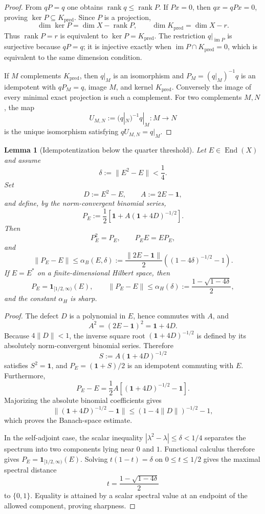 \documentclass[11pt]{article}
\newtheorem{lemma}[theorem]{Lemma}
\theoremstyle{definition}
\theoremstyle{remark}
\newcommand{\one}{\mathbf 1}
\newcommand{\rank}{\operatorname{rank}}
\newcommand{\End}{\operatorname{End}}
\newcommand{\norm}[1]{\lVert#1\rVert}
\newcommand{\pred}{\mathrm{pred}}
\begin{document}
\begin{proof}
From \(qP=q\) one obtains \(\rank q\le\rank P\).  If \(Px=0\), then
\(qx=qPx=0\), proving \(\ker P\subseteq K_{\pred}\).  Since \(P\) is a
projection,
\[
 \dim\ker P=\dim X-\rank P,\qquad
 \dim K_{\pred}=\dim X-r.
\]
Thus \(\rank P=r\) is equivalent to \(\ker P=K_{\pred}\).  The restriction
\(q|_{\operatorname{im}P}\) is surjective because \(qP=q\); it is injective
exactly when \(\operatorname{im}P\cap K_{\pred}=0\), which is equivalent to
the same dimension condition.

If \(M\) complements \(K_{\pred}\), then \(q|_M\) is an isomorphism and
\(P_M=(q|_M)^{-1}q\) is an idempotent with \(qP_M=q\), image \(M\), and
kernel \(K_{\pred}\).  Conversely the image of every minimal exact
projection is such a complement.  For two complements \(M,N\), the map
\[
 U_{M,N}:=(q|_N)^{-1}q|_M:M\longrightarrow N
\]
is the unique isomorphism satisfying \(qU_{M,N}=q|_M\).
\end{proof}

\begin{lemma}[Idempotentization below the quarter threshold]
\label{lem:predictive-idempotentization}
Let \(E\in\End(X)\) and assume
\[
 \delta:=\norm{E^2-E}<\frac14.
\]
Set
\[
 D:=E^2-E,\qquad A:=2E-\one,
\]
and define, by the norm-convergent binomial series,
\[
 P_E:=\frac12\left[\one+A(\one+4D)^{-1/2}\right].
\]
Then
\[
 P_E^2=P_E,\qquad P_EE=EP_E,
\]
and
\[
 \norm{P_E-E}
 \le
 \alpha_B(E,\delta)
 :=
 \frac{\norm{2E-\one}}2
 \left((1-4\delta)^{-1/2}-1\right).
\]
If \(E=E^*\) on a finite-dimensional Hilbert space, then
\[
 P_E=\mathbf 1_{[1/2,\infty)}(E),\qquad
 \norm{P_E-E}
 \le
 \alpha_H(\delta):=
 \frac{1-\sqrt{1-4\delta}}2,
\]
and the constant \(\alpha_H\) is sharp.
\end{lemma}

\begin{proof}
The defect \(D\) is a polynomial in \(E\), hence commutes with \(A\), and
\[
 A^2=(2E-\one)^2=\one+4D.
\]
Because \(4\norm D<1\), the inverse square root
\((\one+4D)^{-1/2}\) is defined by its absolutely norm-convergent binomial
series.  Therefore
\[
 S:=A(\one+4D)^{-1/2}
\]
satisfies \(S^2=\one\), and \(P_E=(\one+S)/2\) is an idempotent commuting
with \(E\).  Furthermore,
\[
 P_E-E
 =\frac12A\left[(\one+4D)^{-1/2}-\one\right].
\]
Majorizing the absolute binomial coefficients gives
\[
 \norm{(\one+4D)^{-1/2}-\one}
 \le (1-4\norm D)^{-1/2}-1,
\]
which proves the Banach-space estimate.

In the self-adjoint case, the scalar inequality
\(|\lambda^2-\lambda|\le\delta<1/4\) separates the spectrum into two
components lying near \(0\) and \(1\).  Functional calculus therefore gives
\(P_E=\mathbf 1_{[1/2,\infty)}(E)\).  Solving
\(t(1-t)=\delta\) on \(0\le t\le1/2\) gives the maximal spectral distance
\[
 t=\frac{1-\sqrt{1-4\delta}}2
\]
to \(\{0,1\}\).  Equality is attained by a scalar spectral value at an
endpoint of the allowed component, proving sharpness.
\end{proof}
\end{document}
